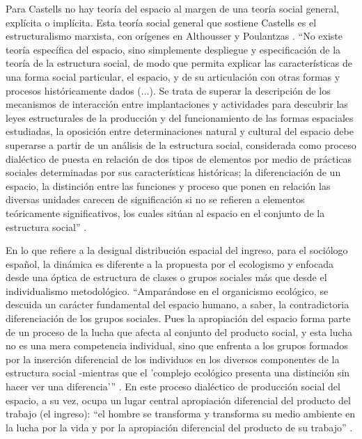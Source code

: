 Para Castells no hay teoría del espacio al margen de una teoría social general, explícita o implícita. Esta teoría social general que sostiene Castells es el estructuralismo marxista, con orígenes en Althousser y Poulantzas \cite[p.~84]{soja}. “No existe teoría específica del espacio, sino simplemente despliegue y especificación de la teoría de la estructura social, de modo que permita explicar las características de una forma social particular, el espacio, y de su articulación con otras formas y procesos históricamente dados (...). Se trata de superar la descripción de los mecanismos de interacción entre implantaciones y actividades para descubrir las leyes estructurales de la producción y del funcionamiento de las formas espaciales estudiadas, la oposición entre determinaciones natural y cultural del espacio debe superarse a partir de un análisis de la estructura social, considerada como proceso dialéctico de puesta en relación de dos tipos de elementos por medio de prácticas sociales determinadas por sus características históricas; la diferenciación de un espacio, la distinción entre las funciones y proceso que ponen en relación las diversas unidades carecen de significación si no se refieren a elementos teóricamente significativos, los cuales sitúan al espacio en el conjunto de la estructura social” \cite[p.~152]{castells}.

En lo que refiere a la desigual distribución espacial del ingreso, para el sociólogo español, la dinámica es diferente a la propuesta por el ecologismo y enfocada desde una óptica de estructura de clases o grupos sociales más que desde el individualismo metodológico. “Amparándose en el organicismo ecológico, se descuida un carácter fundamental del espacio humano, a saber, la contradictoria diferenciación de los grupos sociales. Pues la apropiación del espacio forma parte de un proceso de la lucha que afecta al conjunto del producto social, y esta lucha no es una mera competencia individual, sino que enfrenta a los grupos formados por la inserción diferencial de los individuos en los diversos componentes de la estructura social -mientras que el 'complejo ecológico presenta una distinción sin hacer ver una diferencia'” \cite[p.~148]{castells}. En este proceso dialéctico de producción social del espacio, a su vez, ocupa un lugar central apropiación diferencial del producto del trabajo (el ingreso): “el hombre se transforma y transforma su medio ambiente en la lucha por la vida y por la apropiación diferencial del producto de su trabajo”  \cite[p.~141]{castells}.

